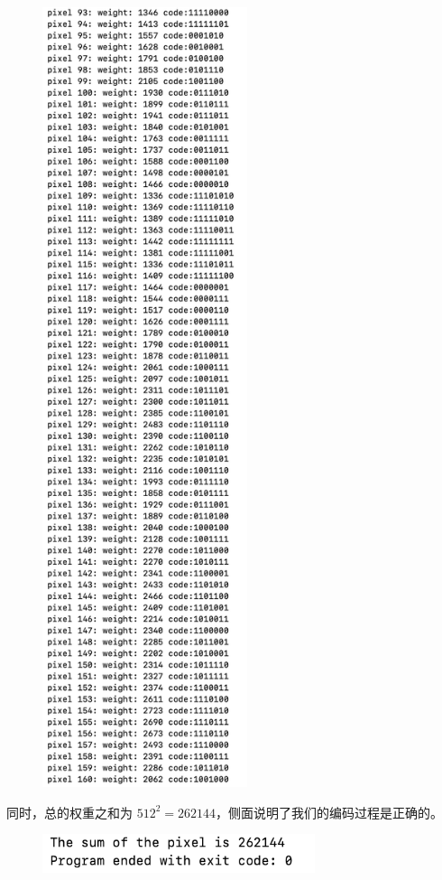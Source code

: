 \begin{enumerate}
\begin{figure}[htbp]
                    \includegraphics*[width = 6cm]{s3_8_1.png}
                \end{figure}
                
                \newpage
                \par 同时，总的权重之和为 $512^2 = 262144$，侧面说明了我们的编码过程是正确的。
                \begin{figure}[htbp]
                    \centering
                    \includegraphics*[width = 8cm]{s3_8_4.png}
                \end{figure}
        \end{enumerate}